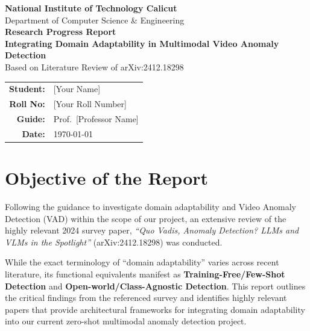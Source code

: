 \documentclass[12pt, a4paper]{article}
\begin{document}
\begin{center}
    {\large \textbf{National Institute of Technology Calicut}}\\[0.3cm]
    {\normalsize Department of Computer Science \& Engineering}\\[1.5cm]
    
    {\Large \textbf{Research Progress Report}}\\[0.8cm]
    
    {\LARGE \textbf{Integrating Domain Adaptability in Multimodal Video Anomaly Detection}}\\[1.5cm]
    
    {\large Based on Literature Review of arXiv:2412.18298}\\[1.5cm]
    
    \begin{tabular}{rl}
        \textbf{Student:} & [Your Name] \\
        \textbf{Roll No:} & [Your Roll Number] \\
        \textbf{Guide:} & Prof.\ [Professor Name] \\
        \textbf{Date:} & \today \\
    \end{tabular}
\end{center}

\newpage

\section{Objective of the Report}

Following the guidance to investigate domain adaptability and Video Anomaly Detection (VAD) within the scope of our project, an extensive review of the highly relevant 2024 survey paper, \textit{``Quo Vadis, Anomaly Detection? LLMs and VLMs in the Spotlight''} (arXiv:2412.18298) was conducted. 

While the exact terminology of ``domain adaptability'' varies across recent literature, its functional equivalents manifest as \textbf{Training-Free/Few-Shot Detection} and \textbf{Open-world/Class-Agnostic Detection}. This report outlines the critical findings from the referenced survey and identifies highly relevant papers that provide architectural frameworks for integrating domain adaptability into our current zero-shot multimodal anomaly detection project.

\end{document}
